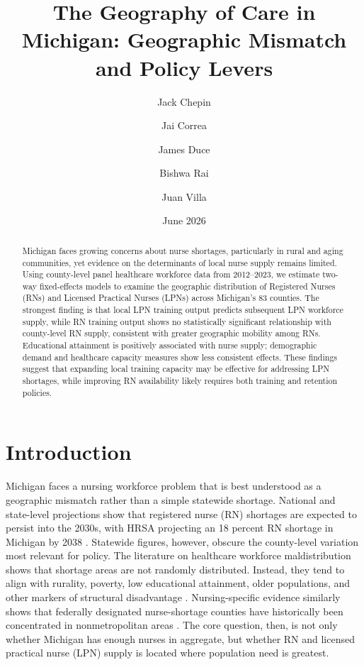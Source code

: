 \documentclass[12pt]{article}
\title{\textbf{The Geography of Care in Michigan: Geographic Mismatch and Policy Levers}}
\author{
    Jack Chepin \and Jai Correa \and James Duce 
    \and Bishwa Rai \and Juan Villa
}
\date{June 2026}
\begin{document}
\maketitle
\onehalfspacing

\begin{abstract}

Michigan faces growing concerns about nurse shortages, particularly in rural and aging communities, yet evidence on the determinants of local nurse supply remains limited. Using county-level panel healthcare workforce data from 2012--2023, we estimate two-way fixed-effects models to examine the geographic distribution of Registered Nurses (RNs) and Licensed Practical Nurses (LPNs) across Michigan's 83 counties. The strongest finding is that local LPN training output predicts subsequent LPN workforce supply, while RN training output shows no statistically significant relationship with county-level RN supply, consistent with greater geographic mobility among RNs. Educational attainment is positively associated with nurse supply; demographic demand and healthcare capacity measures show less consistent effects. These findings suggest that expanding local training capacity may be effective for addressing LPN shortages, while improving RN availability likely requires both training and retention policies.

\end{abstract}

\newpage
\tableofcontents
\newpage

\section{Introduction}


Michigan faces a nursing workforce problem that is best understood as a geographic mismatch rather than a simple statewide shortage. National and state-level projections show that registered nurse (RN) shortages are expected to persist into the 2030s, with HRSA projecting an 18 percent RN shortage in Michigan by 2038 \citep{hrsa2025}. Statewide figures, however, obscure the county-level variation most relevant for policy. The literature on healthcare workforce maldistribution shows that shortage areas are not randomly distributed. Instead, they tend to align with rurality, poverty, low educational attainment, older populations, and other markers of structural disadvantage \citep{streeter2020}. Nursing-specific evidence similarly shows that federally designated nurse-shortage counties have historically been concentrated in nonmetropolitan areas \citep{stratton1995redefining}. The core question, then, is not only whether Michigan has enough nurses in aggregate, but whether RN and licensed practical nurse (LPN) supply is located where population need is greatest.
\end{document}
